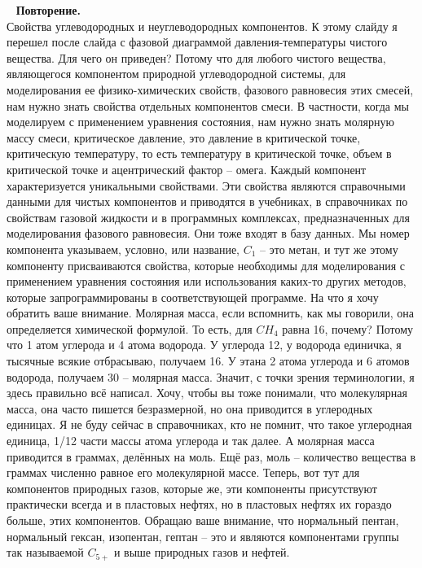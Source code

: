 \documentclass[main.tex]{subfiles}
\begin{document}
\ \newline
\textbf{Повторение.}\\
Свойства углеводородных и неуглеводородных компонентов.
К этому слайду я перешел после слайда с фазовой диаграммой давления-температуры чистого вещества.
Для чего он приведен?
Потому что для любого чистого вещества, являющегося компонентом природной углеводородной системы, для моделирования ее физико-химических свойств, фазового равновесия этих смесей, нам нужно знать свойства отдельных компонентов смеси.
В частности, когда мы моделируем с применением уравнения состояния, нам нужно знать молярную массу смеси, критическое давление, это давление в критической точке, критическую температуру, то есть температуру в критической точке, объем в критической точке и ацентрический фактор -- омега.
Каждый компонент характеризуется уникальными свойствами.
Эти свойства являются справочными данными для чистых компонентов и приводятся в учебниках, в справочниках по свойствам газовой жидкости и в программных комплексах, предназначенных для моделирования фазового равновесия.
Они тоже входят в базу данных.
Мы номер компонента указываем, условно, или название, $C_1$ -- это метан, и тут же этому компоненту присваиваются свойства, которые необходимы для моделирования с применением уравнения состояния или использования каких-то других методов, которые запрограммированы в соответствующей программе.
На что я хочу обратить ваше внимание.
Молярная масса, если вспомнить, как мы говорили, она определяется химической формулой.
То есть, для $CH_4$ равна 16, почему?
Потому что 1 атом углерода и 4 атома водорода.
У углерода 12, у водорода единичка, я тысячные всякие отбрасываю, получаем 16.
У этана 2 атома углерода и 6 атомов водорода, получаем 30 -- молярная масса.
Значит, с точки зрения терминологии, я здесь правильно всё написал.
Хочу, чтобы вы тоже понимали, что молекулярная масса, она часто пишется безразмерной, но она приводится в углеродных единицах.
Я не буду сейчас в справочниках, кто не помнит, что такое углеродная единица, 1/12 части массы атома углерода и так далее.
А молярная масса приводится в граммах, делённых на моль.
Ещё раз, моль -- количество вещества в граммах численно равное его молекулярной массе.
Теперь, вот тут для компонентов природных газов, которые же, эти компоненты присутствуют практически всегда и в пластовых нефтях, но в пластовых нефтях их гораздо больше, этих компонентов.
Обращаю ваше внимание, что нормальный пентан, нормальный гексан, изопентан, гептан -- это и являются компонентами группы так называемой $C_{5+}$ и выше природных газов и нефтей.
\end{document}
